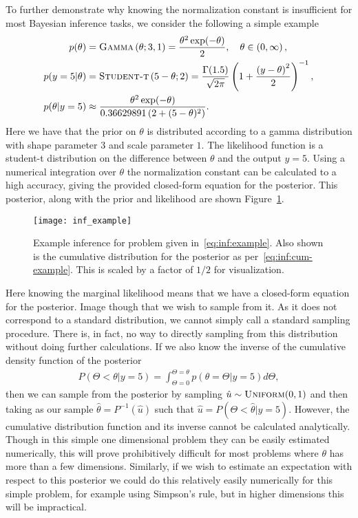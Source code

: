 To further demonstrate why knowing the normalization constant is insufficient
for most Bayesian inference tasks, we consider the following a simple example
\begin{subequations}
\label{eq:inf:example}
\begin{align}
p(\theta) &= \textsc{Gamma}\left(\theta; 3, 1\right) = \frac{\theta^2 \exp(-\theta)}{2},
 \quad \theta\in\left(0,\infty\right), \\
p(y=5|\theta) &= \textsc{Student-t}\left(5-\theta;2\right) = 
\frac{\Gamma (1.5)}{\sqrt{2\pi}}\left(1+\frac{\left(y-\theta\right)^2}{2}\right)^{-1}, \\
p(\theta |y=5) &\approx \frac{\theta^2
	 \exp(-\theta)}{0.36629891\left(2+(5-\theta)^2\right)}.
\end{align}
\end{subequations}
Here we have that the prior on $\theta$ is distributed according to a gamma
distribution with shape parameter $3$ and scale parameter $1$.  The likelihood
function is a student-t distribution on the difference between $\theta$ and the
output $y=5$.  Using a numerical integration over $\theta$ the normalization
constant can be calculated to a high accuracy, giving the provided closed-form
equation for the posterior.  This posterior, along with the prior and likelihood are shown Figure~\ref{fig:inf:inf-example}.

\begin{figure}[t]
	\centering
	\texttt{[image: inf\_example]}
	\caption{Example inference for problem given
		in~\eqref{eq:inf:example}. Also shown is the cumulative distribution for
		the posterior as per~\eqref{eq:inf:cum-example}.  This is scaled by a factor
		of $1/2$ for visualization.  \label{fig:inf:inf-example}}
\end{figure}

Here knowing the marginal likelihood means that we have a 
closed-form equation for the posterior.  Image though that we 
wish to sample from it.  As it does not correspond to a standard distribution,
we cannot simply call a standard sampling procedure.  There is, in fact, no way
to directly sampling from this distribution without doing further calculations.  If
we also know the inverse of the cumulative density function of the posterior
\begin{align}
\label{eq:inf:cum-example}
P(\Theta<\theta | y=5) = \int_{\Theta=0}^{\Theta=\theta}  p(\theta=\Theta | y=5) d\Theta,
\end{align}
then we can sample from the posterior by sampling $\hat{u} \sim \textsc{Uniform}(0,1)$ and
then taking as our sample $\hat{\theta} = P^{-1}(\hat{u})$ such that 
$\hat{u} = P(\Theta<\hat{\theta} | y=5)$.  However, the cumulative distribution function
and its inverse cannot be calculated analytically.  Though in this simple one dimensional
problem they can be easily estimated numerically, this will prove prohibitively difficult
for most problems where $\theta$ has more than a few dimensions.  Similarly, if we
wish to estimate an expectation with respect to this posterior we could do this relatively
easily numerically for this simple problem, for example using Simpson's rule, but in higher
dimensions this will be impractical.

